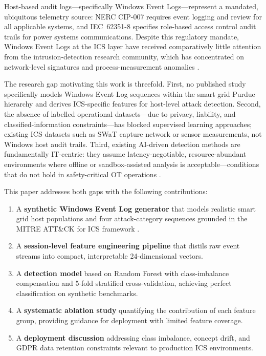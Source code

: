 Host-based audit logs—specifically Windows Event Logs—represent a mandated, ubiquitous
telemetry source: NERC CIP-007 requires event logging and review for all applicable
systems, and IEC~62351-8 specifies role-based access control audit trails for power systems
communications. Despite this regulatory mandate, Windows Event Logs at the ICS layer have
received comparatively little attention from the intrusion-detection research community,
which has concentrated on network-level signatures \cite{goldenberg2013modbus,carcano2011scada}
and process-measurement anomalies \cite{goh2016swat}.

The research gap motivating this work is threefold. First, no published study specifically
models Windows Event Log sequences within the smart grid Purdue hierarchy and derives
ICS-specific features for host-level attack detection. Second, the absence of labelled
operational datasets—due to privacy, liability, and classified-information constraints—has
blocked supervised learning approaches; existing ICS datasets such as SWaT
\cite{goh2016swat} capture network or sensor measurements, not Windows host audit trails.
Third, existing AI-driven detection methods are fundamentally IT-centric: they assume
latency-negotiable, resource-abundant environments where offline or sandbox-assisted
analysis is acceptable—conditions that do not hold in safety-critical OT operations
\cite{nafees2023}.

This paper addresses both gaps with the following contributions:

\begin{enumerate}
  \item A \textbf{synthetic Windows Event Log generator} that models realistic smart grid
        host populations and four attack-category sequences grounded in the MITRE ATT\&CK
        for ICS framework \cite{mitre2020attack}.

  \item A \textbf{session-level feature engineering pipeline} that distils raw event
        streams into compact, interpretable 24-dimensional vectors.

  \item A \textbf{detection model} based on Random Forest with class-imbalance compensation
        and 5-fold stratified cross-validation, achieving perfect classification on synthetic
        benchmarks.

  \item A \textbf{systematic ablation study} quantifying the contribution of each feature
        group, providing guidance for deployment with limited feature coverage.

  \item A \textbf{deployment discussion} addressing class imbalance, concept drift, and
        GDPR data retention constraints relevant to production ICS environments.
\end{enumerate}

